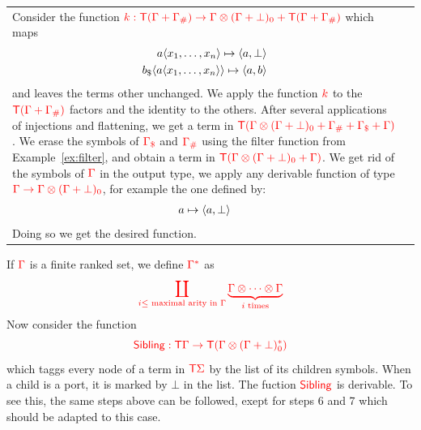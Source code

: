 \begin{example}
\begin{tabular}{l|l}
{	Consider the function ${\color{red}{k:{\color{red}{\mathsf T}}({\color{red}{\Gamma}}+{\color{red}{\Gamma}}_\#)\to {\color{red}{\Gamma}}\otimes({\color{red}{\Gamma}}+\bot)_0+{\color{red}{\mathsf T}}({\color{red}{\Gamma}}+{\color{red}{\Gamma}}_\#)}}$ which maps
\begin{align*}
a\langle{x_1,\dots,x_n}\rangle \mapsto \langle{a,\bot}\rangle \\
b_\$\langle{a\langle{x_1,\dots,x_n}\rangle}\rangle \mapsto \langle{a,b}\rangle 
\end{align*}
and leaves the terms other unchanged. We apply the function ${\color{red}{k}}$ to the ${\color{red}{{\color{red}{\mathsf T}}({\color{red}{\Gamma}}+{\color{red}{\Gamma}}_\#)}}$
factors and the identity to the others. After several applications of injections and flattening, we get a term in ${\color{red}{{\color{red}{\mathsf T}}({\color{red}{\Gamma}}\otimes({\color{red}{\Gamma}}+\bot)_0+{\color{red}{\Gamma}}_\#+{\color{red}{\Gamma}}_\$+{\color{red}{\Gamma}})}}$. We erase the symbols of ${\color{red}{{\color{red}{\Gamma}}_\$}}$ and ${\color{red}{{\color{red}{\Gamma}}_\#}}$  using the filter function from Example~\ref{ex:filter}, and obtain a term in ${\color{red}{{\color{red}{\mathsf T}}({\color{red}{\Gamma}}\otimes({\color{red}{\Gamma}}+\bot)_0+{\color{red}{\Gamma}})}}$. 
We get rid of the symbols of ${\color{red}{\Gamma}}$ in the output type, we apply any derivable function of type ${\color{red}{{\color{red}{\Gamma}}\to {\color{red}{\Gamma}}\otimes({\color{red}{\Gamma}}+\bot)_0}}$, for example the one defined by:
\begin{align*}
a \mapsto \langle{a,\bot}\rangle
\end{align*}
 Doing so we get the desired function.}{}
\end{tabular}

\medskip
If ${\color{red}{\Gamma}}$ is a finite ranked set, we define ${\color{red}{\Gamma^*}}$ as
$${\color{red}{\coprod_{i \leq \text{ maximal arity in } {\color{red}{\Gamma}}} \underbrace{{\color{red}{\Gamma}}\otimes \cdots \otimes {\color{red}{\Gamma}}}_{i\text{ times}}}}$$
Now consider the function $${\color{red}{\mathsf{Sibling}:{\color{red}{\mathsf T}}{\color{red}{\Gamma}}\to {\color{red}{\mathsf T}}({\color{red}{\Gamma}}\otimes ({\color{red}{\Gamma}}+\bot)^*_0)}}$$ which taggs every node of a term in ${\color{red}{\mathsf T}} {\color{red}{\Sigma}}$ by the list  of its children symbols. When a child is a port, it is marked by $\bot$ in the list.
The fuction ${\color{red}{\mathsf{Sibling}}}$ is derivable. To see this, the same steps above can be followed, exept for steps 6 and 7 which should be adapted to this case. 
\end{example}



